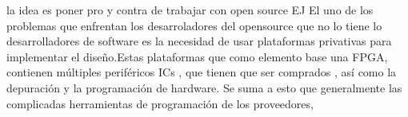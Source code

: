 \documentclass[a4paper,11pt]{article}
\begin{document}
la idea es poner pro y contra de trabajar con open source
EJ
El uno de los problemas que enfrentan los desarroladores del opensource que no lo tiene lo desarrolladores  de software es la necesidad de usar plataformas privativas para implementar el diseño.Estas plataformas que como elemento base una FPGA, contienen múltiples periféricos ICs , que tienen que ser comprados , así como la depuración y la programación de hardware.
Se suma a esto que generalmente las complicadas herramientas de programación de los proveedores, 
\end{document}

